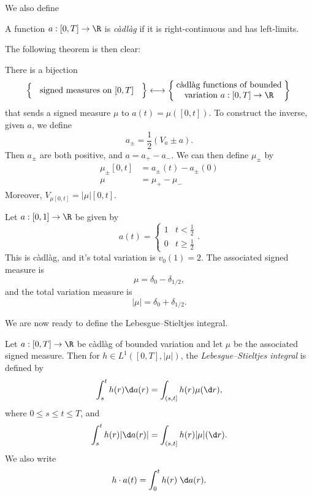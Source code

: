 \documentclass[a4paper]{article}
\begin{document}
We also define
\begin{defi}[c\`adl\`ag]
  A function $a: [0, T] \to \R$ is \emph{c\`adl\`ag} if it is right-continuous and has left-limits.
\end{defi}

The following theorem is then clear:
\begin{thm}
  There is a bijection
  \[
    \left\{\vphantom{\parbox{4.5cm}{a\\b}}\parbox{4.5cm}{\centering signed measures on $[0, T]$} \right\} \longleftrightarrow \left\{\parbox{4.5cm}{\centering c\`adl\`ag functions of bounded variation $a: [0, T] \to \R$}\right\}\\
  \]
  that sends a signed measure $\mu$ to $a(t) = \mu([0, t])$. To construct the inverse, given $a$, we define
  \[
    a_{\pm} = \frac{1}{2}(V_a \pm a).
  \]
  Then $a_{\pm}$ are both positive, and $a = a_+ - a_-$. We can then define $\mu_{\pm}$ by
  \begin{align*}
    \mu_{\pm}[0, t] &= a_{\pm}(t) - a_{\pm}(0)\\
    \mu &= \mu_+ - \mu_-
  \end{align*}
  Moreover, $V_{\mu[0, t]} = |\mu|[0, t]$.
\end{thm}

\begin{eg}
  Let $a: [0, 1] \to \R$ be given by
  \[
    a(t) =
    \begin{cases}
      1 & t < \frac{1}{2}\\
      0 & t \geq \frac{1}{2}
    \end{cases}.
  \]
  This is c\`adl\`ag, and it's total variation is $v_0(1) = 2$. The associated signed measure is
  \[
    \mu = \delta_0 - \delta_{1/2},
  \]
  and the total variation measure is
  \[
    |\mu| = \delta_0 + \delta_{1/2}.
  \]
\end{eg}

We are now ready to define the Lebesgue--Stieltjes integral.

\begin{defi}
  Let $a: [0, T] \to \R$ be c\`adl\`ag of bounded variation and let $\mu$ be the associated signed measure. Then for $h \in L^1([0, T], |\mu|)$, the \emph{Lebesgue--Stieltjes integral} is defined by
  \[
    \int_s^t h(r) \d a(r) = \int_{(s, t]} h(r) \mu (\d r),
  \]
  where $0 \leq s \leq t \leq T$, and
  \[
    \int_s^t h(r) |\d a(r)| = \int_{(s, t]} h(r) |\mu| (\d r).
  \]
  We also write
  \[
    h \cdot a(t) = \int_0^t h(r) \;\d a(r).
  \]
\end{defi}
\end{document}
